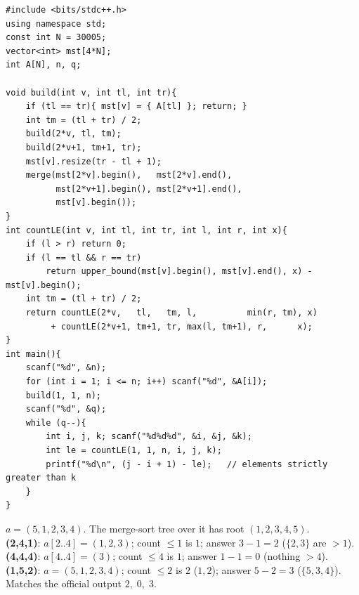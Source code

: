 \begin{lstlisting}[caption={SPOJ KQUERY full solution: build a merge-sort tree, answer each query with one range count}, label={lst:c19-kquery-soln}]
#include <bits/stdc++.h>
using namespace std;
const int N = 30005;
vector<int> mst[4*N];
int A[N], n, q;

void build(int v, int tl, int tr){
    if (tl == tr){ mst[v] = { A[tl] }; return; }
    int tm = (tl + tr) / 2;
    build(2*v, tl, tm);
    build(2*v+1, tm+1, tr);
    mst[v].resize(tr - tl + 1);
    merge(mst[2*v].begin(),   mst[2*v].end(),
          mst[2*v+1].begin(), mst[2*v+1].end(),
          mst[v].begin());
}
int countLE(int v, int tl, int tr, int l, int r, int x){
    if (l > r) return 0;
    if (l == tl && r == tr)
        return upper_bound(mst[v].begin(), mst[v].end(), x) - mst[v].begin();
    int tm = (tl + tr) / 2;
    return countLE(2*v,   tl,   tm, l,          min(r, tm), x)
         + countLE(2*v+1, tm+1, tr, max(l, tm+1), r,      x);
}
int main(){
    scanf("%d", &n);
    for (int i = 1; i <= n; i++) scanf("%d", &A[i]);
    build(1, 1, n);
    scanf("%d", &q);
    while (q--){
        int i, j, k; scanf("%d%d%d", &i, &j, &k);
        int le = countLE(1, 1, n, i, j, k);
        printf("%d\n", (j - i + 1) - le);   // elements strictly greater than k
    }
}
\end{lstlisting}

\begin{tracebox}[KQUERY on a=(5,1,2,3,4): three queries]
\(a=(5,1,2,3,4)\).  The merge-sort tree over it has root \((1,2,3,4,5)\).\\
\textbf{(2,4,1)}: \(a[2..4]=(1,2,3)\); count \(\le 1\) is \(1\); answer \(3-1=\boxed{2}\) (\(\{2,3\}\) are \(>1\)).\\
\textbf{(4,4,4)}: \(a[4..4]=(3)\); count \(\le 4\) is \(1\); answer \(1-1=\boxed{0}\) (nothing \(>4\)).\\
\textbf{(1,5,2)}: \(a=(5,1,2,3,4)\); count \(\le 2\) is \(2\) (\(1,2\)); answer \(5-2=\boxed{3}\) (\(\{5,3,4\}\)).  Matches the official output \(2,\;0,\;3\).
\end{tracebox}


